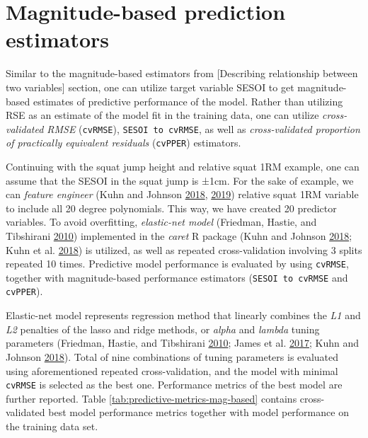 \documentclass[
]{book}
\begin{document}
\hypertarget{magnitude-based-prediction-estimators}{%
\section{Magnitude-based prediction estimators}\label{magnitude-based-prediction-estimators}}

Similar to the magnitude-based estimators from {[}Describing relationship between two variables{]} section, one can utilize target variable SESOI to get magnitude-based estimates of predictive performance of the model. Rather than utilizing RSE as an estimate of the model fit in the training data, one can utilize \emph{cross-validated RMSE} (\texttt{cvRMSE}), \texttt{SESOI\ to\ cvRMSE}, as well as \emph{cross-validated proportion of practically equivalent residuals} (\texttt{cvPPER}) estimators.

Continuing with the squat jump height and relative squat 1RM example, one can assume that the SESOI in the squat jump is ±1cm. For the sake of example, we can \emph{feature engineer} (Kuhn and Johnson \protect\hyperlink{ref-kuhnAppliedPredictiveModeling2018}{2018}, \protect\hyperlink{ref-kuhnFeatureEngineeringSelection2019}{2019}) relative squat 1RM variable to include all 20 degree polynomials. This way, we have created 20 predictor variables. To avoid overfitting, \emph{elastic-net model} (Friedman, Hastie, and Tibshirani \protect\hyperlink{ref-friedmanRegularizationPathsGeneralized2010}{2010}) implemented in the \emph{caret} R package (Kuhn and Johnson \protect\hyperlink{ref-kuhnAppliedPredictiveModeling2018}{2018}; Kuhn et al. \protect\hyperlink{ref-kuhnCaretClassificationRegression2018}{2018}) is utilized, as well as repeated cross-validation involving 3 splits repeated 10 times. Predictive model performance is evaluated by using \texttt{cvRMSE}, together with magnitude-based performance estimators (\texttt{SESOI\ to\ cvRMSE} and \texttt{cvPPER}).

Elastic-net model represents regression method that linearly combines the \emph{L1} and \emph{L2} penalties of the lasso and ridge methods, or \emph{alpha} and \emph{lambda} tuning parameters (Friedman, Hastie, and Tibshirani \protect\hyperlink{ref-friedmanRegularizationPathsGeneralized2010}{2010}; James et al. \protect\hyperlink{ref-jamesIntroductionStatisticalLearning2017}{2017}; Kuhn and Johnson \protect\hyperlink{ref-kuhnAppliedPredictiveModeling2018}{2018}). Total of nine combinations of tuning parameters is evaluated using aforementioned repeated cross-validation, and the model with minimal \texttt{cvRMSE} is selected as the best one. Performance metrics of the best model are further reported. Table \ref{tab:predictive-metrics-mag-based} contains cross-validated best model performance metrics together with model performance on the training data set.
\end{document}
